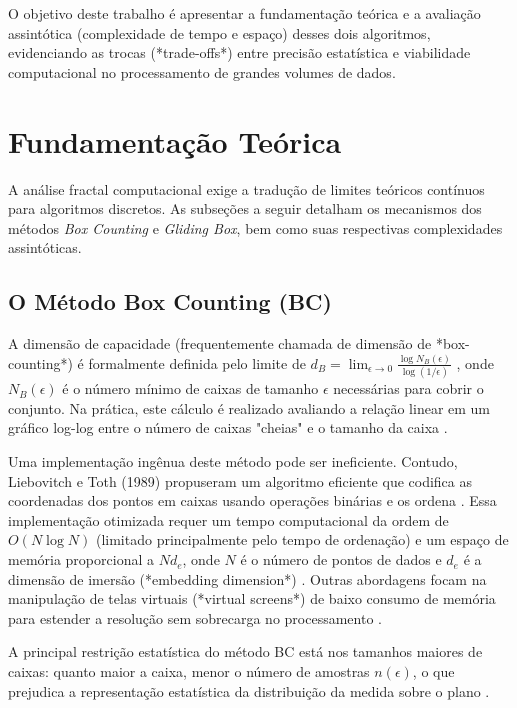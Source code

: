 \documentclass[12pt]{article}
\begin{document}
O objetivo deste trabalho é apresentar a fundamentação teórica e a avaliação assintótica (complexidade de tempo e espaço) desses dois algoritmos, evidenciando as trocas (*trade-offs*) entre precisão estatística e viabilidade computacional no processamento de grandes volumes de dados.

\section{Fundamentação Teórica}

A análise fractal computacional exige a tradução de limites teóricos contínuos para algoritmos discretos. As subseções a seguir detalham os mecanismos dos métodos \textit{Box Counting} e \textit{Gliding Box}, bem como suas respectivas complexidades assintóticas.

\subsection{O Método Box Counting (BC)}

A dimensão de capacidade (frequentemente chamada de dimensão de *box-counting*) é formalmente definida pelo limite de $d_B = \lim_{\epsilon \to 0} \frac{\log N_B(\epsilon)}{\log(1/\epsilon)}$ \cite{liebovitch1989}, onde $N_B(\epsilon)$ é o número mínimo de caixas de tamanho $\epsilon$ necessárias para cobrir o conjunto. Na prática, este cálculo é realizado avaliando a relação linear em um gráfico log-log entre o número de caixas "cheias" e o tamanho da caixa \cite{gonzato1998}.

Uma implementação ingênua deste método pode ser ineficiente. Contudo, Liebovitch e Toth (1989) propuseram um algoritmo eficiente que codifica as coordenadas dos pontos em caixas usando operações binárias e os ordena \cite{liebovitch1989}. Essa implementação otimizada requer um tempo computacional da ordem de $O(N \log N)$ (limitado principalmente pelo tempo de ordenação) e um espaço de memória proporcional a $N d_e$, onde $N$ é o número de pontos de dados e $d_e$ é a dimensão de imersão (*embedding dimension*) \cite{liebovitch1989}. Outras abordagens focam na manipulação de telas virtuais (*virtual screens*) de baixo consumo de memória para estender a resolução sem sobrecarga no processamento \cite{gonzato1998}.

A principal restrição estatística do método BC está nos tamanhos maiores de caixas: quanto maior a caixa, menor o número de amostras $n(\epsilon)$, o que prejudica a representação estatística da distribuição da medida sobre o plano \cite{saa2007}.
\end{document}
